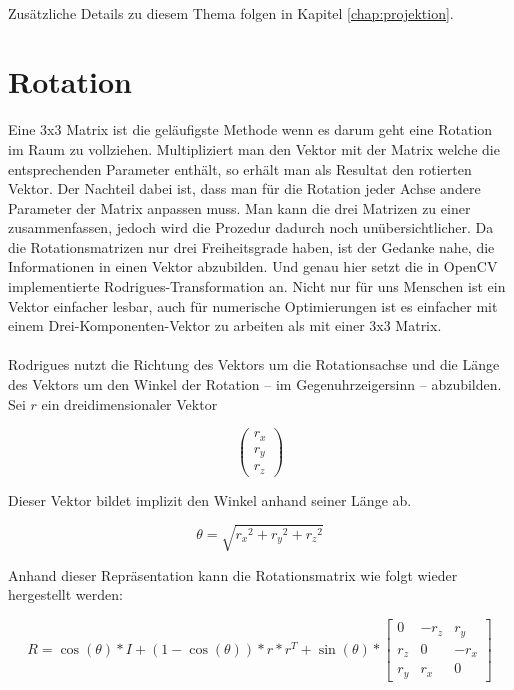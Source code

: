 \paragraph{}
Zusätzliche Details zu diesem Thema folgen in Kapitel \ref{chap:projektion}.


\section{Rotation}
Eine 3x3 Matrix ist die geläufigste Methode wenn es darum geht eine Rotation im Raum zu vollziehen. Multipliziert man den Vektor mit der Matrix welche die entsprechenden Parameter enthält, so erhält man als Resultat den rotierten Vektor. Der Nachteil dabei ist, dass man für die Rotation jeder Achse andere Parameter der Matrix anpassen muss. Man kann die drei Matrizen zu einer zusammenfassen, jedoch wird die Prozedur dadurch noch unübersichtlicher. Da die Rotationsmatrizen nur drei Freiheitsgrade haben, ist der Gedanke nahe, die Informationen in einen Vektor abzubilden. Und genau hier setzt die in OpenCV implementierte Rodrigues-Transformation an. Nicht nur für uns Menschen ist ein Vektor einfacher lesbar, auch für numerische Optimierungen ist es einfacher mit einem Drei-Komponenten-Vektor zu arbeiten als mit einer 3x3 Matrix.

\paragraph{}
Rodrigues nutzt die Richtung des Vektors um die Rotationsachse und die Länge des Vektors um den Winkel der Rotation – im Gegenuhrzeigersinn – abzubilden. Sei $r$ ein dreidimensionaler Vektor 

\begin{equation}
\begin{pmatrix} r_x \\ r_y \\ r_z \end{pmatrix}
\end{equation}

Dieser Vektor bildet implizit den Winkel anhand seiner Länge ab.

\begin{equation}
\theta = \sqrt{{r_x}^2 + {r_y}^2 + {r_z}^2}
\end{equation}

Anhand dieser Repräsentation kann die Rotationsmatrix wie folgt wieder hergestellt werden:

\begin{equation}
R = \cos(\theta) * I + (1 - \cos(\theta)) * r * r^T + \sin(\theta) * 
\begin{bmatrix}
0 & -r_z & r_y \\
r_z & 0 & -r_x \\
r_y & r_x & 0
\end{bmatrix}
\end{equation}

